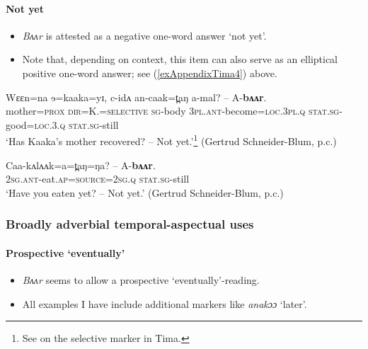 \paragraph{Not yet}
\label{appendixTimaNotYet}
\begin{itemize}
	\item \textit{Bʌʌr} is attested as a negative one-word answer \lq not yet'.
	\item Note that, depending on context, this item can also serve as an elliptical positive one-word answer; see (\ref{exAppendixTima4}) above.
\end{itemize}
\begin{exe}
	\ex
	\gll Wɛɛn=na ɘ=kaaka=yɪ, c-idʌ an-caak=t̪aŋ a-mal? – A-\textbf{bʌʌr}.\\
	mother=\textsc{prox} \textsc{dir}=K.=\textsc{selective} \textsc{sg}-body 3\textsc{pl}.\textsc{ant}-become=\textsc{loc}.3\textsc{pl}.\textsc{q} \textsc{stat}.\textsc{sg}-good=\textsc{loc}.3.\textsc{q} {} \textsc{stat}.\textsc{sg}-still\\
	\glt \lq Has Kaaka's mother recovered? -- Not yet.\rq{}\footnote{See \textcite{BeckerSchneiderBlum2020} on the selective marker in Tima.} (Gertrud Schneider-Blum, p.c.)
	
	\ex
	\gll Caa-kʌlʌʌk=a=t̪aŋ=ŋa? – A-\textbf{bʌʌr}.\\
	2\textsc{sg}.\textsc{ant}-eat.\textsc{ap}=\textsc{source}=2\textsc{sg}.\textsc{q} {} \textsc{stat}.\textsc{sg}-still\\
	\glt \lq Have you eaten yet? -- Not yet.\rq{ }(Gertrud Schneider-Blum, p.c.)
\end{exe}

\subsubsection{Broadly adverbial temporal-aspectual uses}
\paragraph{Prospective \lq eventually\rq{}}\label{appendixTimaProspective}
\begin{itemize}
	\item \textit{Bʌʌr} seems to allow a prospective \lq eventually'-reading.
	\item All examples I have include additional markers like \textit{anakɔɔ} \lq later'.
\end{itemize}


